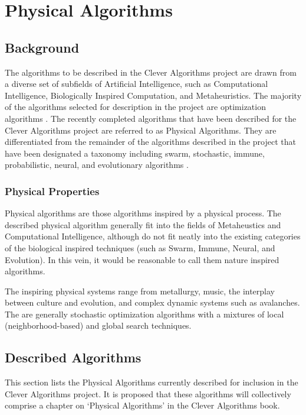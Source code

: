\documentclass[a4paper, 11pt]{article}
\begin{document}
\section{Physical Algorithms}
\label{sec:algorithms}

% 
% 
\subsection{Background}
The algorithms to be described in the Clever Algorithms project are drawn from a diverse set of subfields of Artificial Intelligence, such as Computational Intelligence, Biologically Inspired Computation, and Metaheuristics. The majority of the algorithms selected for description in the project are optimization algorithms \cite{Brownlee2010b}. 
The recently completed algorithms that have been described for the Clever Algorithms project are referred to as Physical Algorithms. They are differentiated from the remainder of the algorithms described in the project that have been designated a taxonomy including swarm, stochastic, immune, probabilistic, neural, and evolutionary algorithms \cite{Brownlee2010b}. 

\subsubsection{Physical Properties}
Physical algorithms are those algorithms inspired by a physical process. The described physical algorithm generally fit into the fields of Metaheustics and Computational Intelligence, although do not fit neatly into the existing categories of the biological inspired techniques (such as Swarm, Immune, Neural, and Evolution). In this vein, it would be reasonable to call them nature inspired algorithms.

The inspiring physical systems range from metallurgy, music, the interplay between culture and evolution, and complex dynamic systems such as avalanches. The are generally stochastic optimization algorithms with a mixtures of local (neighborhood-based) and global search techniques. 

% 
% 
\subsection{Described Algorithms}
\label{subsec:algorithms}
This section lists the Physical Algorithms currently described for inclusion in the Clever Algorithms project. It is proposed that these algorithms will collectively comprise a chapter on `Physical Algorithms' in the Clever Algorithms book. 
\end{document}
